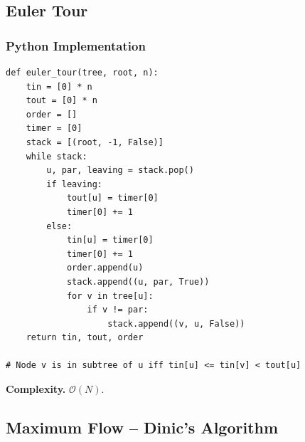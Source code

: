 \documentclass[10pt,a4paper]{article}
\theoremstyle{cpstyle}
\newcommand{\bigO}[1]{\mathcal{O}\!\left(#1\right)}
\begin{document}
\subsection{Euler Tour}

\subsubsection{Python Implementation}
\begin{lstlisting}[caption={Euler Tour -- in/out times for subtree queries}]
def euler_tour(tree, root, n):
    tin = [0] * n
    tout = [0] * n
    order = []
    timer = [0]
    stack = [(root, -1, False)]
    while stack:
        u, par, leaving = stack.pop()
        if leaving:
            tout[u] = timer[0]
            timer[0] += 1
        else:
            tin[u] = timer[0]
            timer[0] += 1
            order.append(u)
            stack.append((u, par, True))
            for v in tree[u]:
                if v != par:
                    stack.append((v, u, False))
    return tin, tout, order

# Node v is in subtree of u iff tin[u] <= tin[v] < tout[u]
\end{lstlisting}

\textbf{Complexity.} $\bigO{N}$.

\subsection{Maximum Flow -- Dinic's Algorithm}
\end{document}

